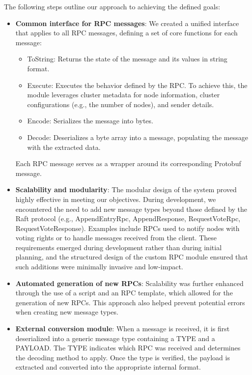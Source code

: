 The following steps outline our approach to achieving the defined goals:
\begin{itemize}
	\item \textbf{Common interface for RPC messages}:
    We created a unified interface that applies to all RPC messages, defining a set of 
    core functions for each message:
    	\begin{itemize}
        	\item ToString: Returns the state of the message and its values in string format.
        	\item Execute: Executes the behavior defined by the RPC. To achieve this, the 
            module leverages cluster metadata for node information, cluster configurations 
            (e.g., the number of nodes), and sender details.
        	\item Encode: Serializes the message into bytes.
        	\item Decode: Deserializes a byte array into a message, populating the message with the extracted data.
	    \end{itemize}
    	Each RPC message serves as a wrapper around its corresponding Protobuf message.

    	\item \textbf{Scalability and modularity}:
    The modular design of the system proved highly effective in meeting our objectives. 
    During development, we encountered the need to add new message types beyond those 
    defined by the Raft protocol (e.g., AppendEntryRpc, AppendResponse, RequestVoteRpc, 
    RequestVoteResponse). Examples include RPCs used to notify nodes with voting rights 
    or to handle messages received from the client.
    These requirements emerged during development rather than during initial planning, 
    and the structured design of the custom RPC module ensured that such additions 
    were minimally invasive and low-impact.

    	\item \textbf{Automated generation of new RPCs}:
    Scalability was further enhanced through the use of a script and an RPC template, 
    which allowed for the generation of new RPCs. This approach also helped prevent 
    potential errors when creating new message types.

    	\item \textbf{External conversion module}:
    When a message is received, it is first deserialized into a generic message type 
    containing a TYPE and a PAYLOAD.
    The TYPE indicates which RPC was received and determines the decoding method to apply.
    Once the type is verified, the payload is extracted and converted into the appropriate internal format.


\end{itemize}
